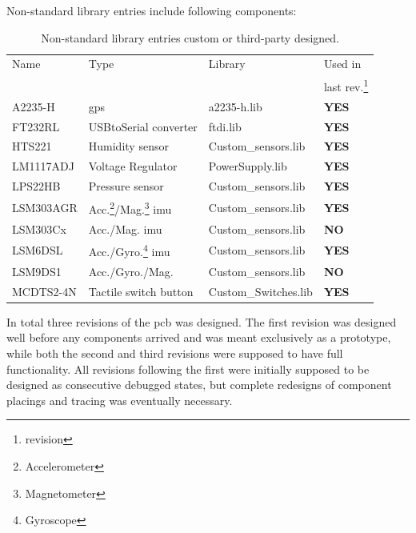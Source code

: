 Non-standard library entries include following components:\\
\begin{minipage}{\linewidth}
\begin{table}[H]
\centering
	\begin{tabular}{ l | l | l | l }
 	Name		& Type 								& Library 				& Used in         \\
 			&									&					& last rev.\footnote{revision}\\
	\hline
  	A2235-H  	& \gls{gps} 								& a2235-h.lib 			& \textbf{YES}\\
  	FT232RL 	& USBtoSerial converter 						& ftdi.lib\cite{ftdi}			& \textbf{YES}\\
  	HTS221 	& Humidity sensor 							& Custom\_sensors.lib 		& \textbf{YES}\\
  	LM1117ADJ 	& Voltage Regulator						& PowerSupply.lib\cite{lm1117} 	& \textbf{YES}\\
  	LPS22HB 	& Pressure sensor  							& Custom\_sensors.lib 		& \textbf{YES}\\
  	LSM303AGR	& Acc.\footnote{Accelerometer}/Mag.\footnote{Magnetometer} \gls{imu} & Custom\_sensors.lib & \textbf{YES}\\
  	LSM303Cx 	& Acc./Mag. \gls{imu} 						& Custom\_sensors.lib		& \textbf{NO} \\
  	LSM6DSL 	& Acc./Gyro.\footnote{Gyroscope} \gls{imu} 			& Custom\_sensors.lib 		& \textbf{YES}\\
  	LSM9DS1 	& Acc./Gyro./Mag. 							& Custom\_sensors.lib 		& \textbf{NO} \\
  	MCDTS2-4N 	& Tactile switch button 						& Custom\_Switches.lib 		& \textbf{YES}\\
\end{tabular}
\caption{Non-standard library entries custom or third-party designed.}
\label{table:nstdlibs}
\end{table}
\end{minipage}
\vfill

In total three revisions of the \gls{pcb} was designed. The first revision was designed well before any components arrived and was meant exclusively as a prototype, while both the second and third revisions were supposed to have full functionality. All revisions following the first were initially supposed to be designed as consecutive debugged states, but complete redesigns of component placings and tracing was eventually necessary.


